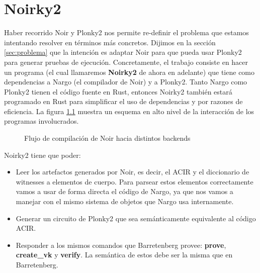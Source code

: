 
\chapter{Noirky2}
Haber recorrido Noir y Plonky2 nos permite re-definir el problema que estamos intentando resolver en términos más concretos. Dijimos en la sección \ref{sec:problema} que la intención es adaptar Noir para que pueda usar Plonky2 para generar pruebas de ejecución. Concretamente, el trabajo consiste en hacer un programa (el cual llamaremos \textbf{Noirky2} de ahora en adelante) que tiene como dependencias a Nargo (el compilador de Noir) y a Plonky2. Tanto Nargo como Plonky2 tienen el código fuente en Rust, entonces Noirky2 también estará programado en Rust para simplificar el uso de dependencias y por razones de eficiencia. La figura \ref{fig:esquema_noirky2} muestra un esquema en alto nivel de la interacción de los programas involucrados.

\begin{figure}[h]
\centering
{}
\caption{Flujo de compilación de Noir hacia distintos backends}
\label{fig:esquema_noirky2}
\end{figure}


Noirky2 tiene que poder:

\begin{itemize}
    \item Leer los artefactos generados por Noir, es decir, el ACIR y el diccionario de witnesses a elementos de cuerpo. Para parsear estos elementos correctamente vamos a usar de forma directa el código de Nargo, ya que nos vamos a manejar con el mismo sistema de objetos que Nargo usa internamente. 
    \item Generar un circuito de Plonky2 que sea semánticamente equivalente al código ACIR.
    \item Responder a los mismos comandos que Barretenberg provee: \textbf{prove}, \textbf{create\_vk} y \textbf{verify}. La semántica de estos debe ser la misma que en Barretenberg.
\end{itemize}

